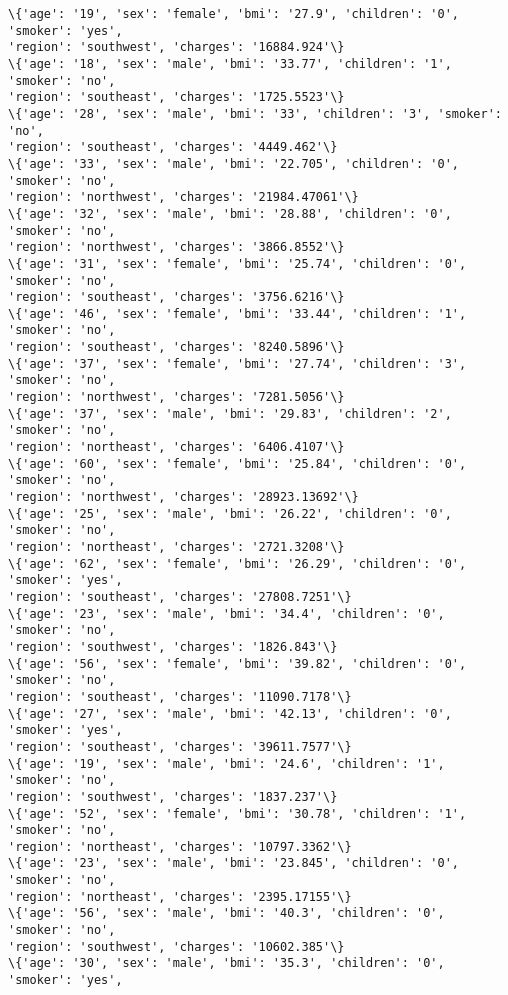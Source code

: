 \documentclass[11pt]{article}
\begin{document}
    \begin{Verbatim}[commandchars=\\\{\}]
\{'age': '19', 'sex': 'female', 'bmi': '27.9', 'children': '0', 'smoker': 'yes',
'region': 'southwest', 'charges': '16884.924'\}
\{'age': '18', 'sex': 'male', 'bmi': '33.77', 'children': '1', 'smoker': 'no',
'region': 'southeast', 'charges': '1725.5523'\}
\{'age': '28', 'sex': 'male', 'bmi': '33', 'children': '3', 'smoker': 'no',
'region': 'southeast', 'charges': '4449.462'\}
\{'age': '33', 'sex': 'male', 'bmi': '22.705', 'children': '0', 'smoker': 'no',
'region': 'northwest', 'charges': '21984.47061'\}
\{'age': '32', 'sex': 'male', 'bmi': '28.88', 'children': '0', 'smoker': 'no',
'region': 'northwest', 'charges': '3866.8552'\}
\{'age': '31', 'sex': 'female', 'bmi': '25.74', 'children': '0', 'smoker': 'no',
'region': 'southeast', 'charges': '3756.6216'\}
\{'age': '46', 'sex': 'female', 'bmi': '33.44', 'children': '1', 'smoker': 'no',
'region': 'southeast', 'charges': '8240.5896'\}
\{'age': '37', 'sex': 'female', 'bmi': '27.74', 'children': '3', 'smoker': 'no',
'region': 'northwest', 'charges': '7281.5056'\}
\{'age': '37', 'sex': 'male', 'bmi': '29.83', 'children': '2', 'smoker': 'no',
'region': 'northeast', 'charges': '6406.4107'\}
\{'age': '60', 'sex': 'female', 'bmi': '25.84', 'children': '0', 'smoker': 'no',
'region': 'northwest', 'charges': '28923.13692'\}
\{'age': '25', 'sex': 'male', 'bmi': '26.22', 'children': '0', 'smoker': 'no',
'region': 'northeast', 'charges': '2721.3208'\}
\{'age': '62', 'sex': 'female', 'bmi': '26.29', 'children': '0', 'smoker': 'yes',
'region': 'southeast', 'charges': '27808.7251'\}
\{'age': '23', 'sex': 'male', 'bmi': '34.4', 'children': '0', 'smoker': 'no',
'region': 'southwest', 'charges': '1826.843'\}
\{'age': '56', 'sex': 'female', 'bmi': '39.82', 'children': '0', 'smoker': 'no',
'region': 'southeast', 'charges': '11090.7178'\}
\{'age': '27', 'sex': 'male', 'bmi': '42.13', 'children': '0', 'smoker': 'yes',
'region': 'southeast', 'charges': '39611.7577'\}
\{'age': '19', 'sex': 'male', 'bmi': '24.6', 'children': '1', 'smoker': 'no',
'region': 'southwest', 'charges': '1837.237'\}
\{'age': '52', 'sex': 'female', 'bmi': '30.78', 'children': '1', 'smoker': 'no',
'region': 'northeast', 'charges': '10797.3362'\}
\{'age': '23', 'sex': 'male', 'bmi': '23.845', 'children': '0', 'smoker': 'no',
'region': 'northeast', 'charges': '2395.17155'\}
\{'age': '56', 'sex': 'male', 'bmi': '40.3', 'children': '0', 'smoker': 'no',
'region': 'southwest', 'charges': '10602.385'\}
\{'age': '30', 'sex': 'male', 'bmi': '35.3', 'children': '0', 'smoker': 'yes',

\end{Verbatim}
\end{document}
